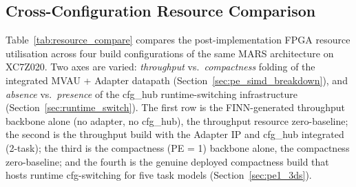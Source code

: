 \documentclass[12pt, a4paper]{report}
\numberwithin{equation}{chapter}
\numberwithin{figure}{chapter}
\numberwithin{table}{chapter}
\numberwithin{algorithm}{chapter}
\begin{document}
\subsection{Cross-Configuration Resource Comparison}
\label{sec:resource_compare}

Table~\ref{tab:resource_compare} compares the post-implementation FPGA resource utilisation across four build configurations of the same MARS architecture on XC7Z020. Two axes are varied: \emph{throughput} vs.\ \emph{compactness} folding of the integrated MVAU + Adapter datapath (Section~\ref{sec:pe_simd_breakdown}), and \emph{absence} vs.\ \emph{presence} of the cfg\_hub runtime-switching infrastructure (Section~\ref{sec:runtime_switch}). The first row is the FINN-generated throughput backbone alone (no adapter, no cfg\_hub), the throughput resource zero-baseline; the second is the throughput build with the Adapter IP and cfg\_hub integrated (2-task); the third is the compactness (PE = 1) backbone alone, the compactness zero-baseline; and the fourth is the genuine deployed compactness build that hosts runtime cfg-switching for five task models (Section~\ref{sec:pe1_3ds}).
\end{document}
